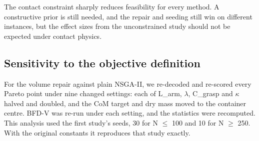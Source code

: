 \documentclass[journal]{IEEEtran}
\begin{document}
\begin{table}[!t]
\caption{Contact-constrained decoder: HV mean $\pm$ SD and feasible seeds out of 10.}\label{tab:7}
\centering\footnotesize
{}
\end{table}

The contact constraint sharply reduces feasibility for every method. A constructive prior is still needed, and the repair and seeding still win on different instances, but the effect sizes from the unconstrained study should not be expected under contact physics.

\subsection{Sensitivity to the objective definition}\label{sec:6.8}

For the volume repair against plain NSGA-II, we re-decoded and re-scored every Pareto point under nine changed settings: each of L\_arm, \(\lambda\), C\_grasp and \(\kappa\) halved and doubled, and the CoM target and dry mass moved to the container centre. BFD-V was re-run under each setting, and the statistics were recomputed. This analysis used the first study's seeds, 30 for N \(\le\) 100 and 10 for N \(\ge\) 250. With the original constants it reproduces that study exactly.
\end{document}
